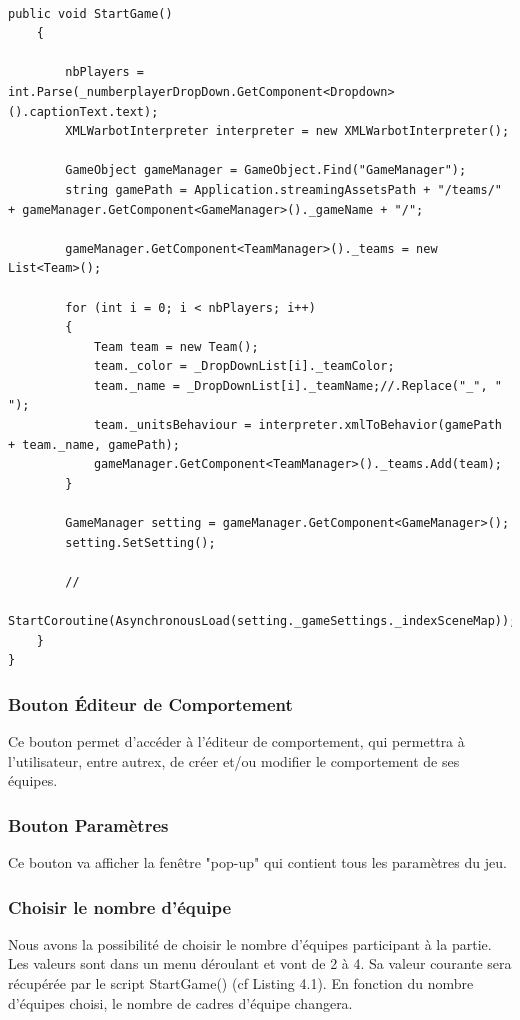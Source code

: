 \documentclass{report}
\begin{document}
\begin{lstlisting}[language={[Sharp]C},label={lst:StartGame()}, caption= Extrait du code de PlayButton.cs]

public void StartGame()
    {
        
        nbPlayers = int.Parse(_numberplayerDropDown.GetComponent<Dropdown>().captionText.text);
        XMLWarbotInterpreter interpreter = new XMLWarbotInterpreter();

        GameObject gameManager = GameObject.Find("GameManager");
        string gamePath = Application.streamingAssetsPath + "/teams/" + gameManager.GetComponent<GameManager>()._gameName + "/";
        
        gameManager.GetComponent<TeamManager>()._teams = new List<Team>();

        for (int i = 0; i < nbPlayers; i++)
        {
            Team team = new Team();
            team._color = _DropDownList[i]._teamColor;
            team._name = _DropDownList[i]._teamName;//.Replace("_", " ");
            team._unitsBehaviour = interpreter.xmlToBehavior(gamePath + team._name, gamePath);
            gameManager.GetComponent<TeamManager>()._teams.Add(team);
        }

        GameManager setting = gameManager.GetComponent<GameManager>();
        setting.SetSetting();

        //
        StartCoroutine(AsynchronousLoad(setting._gameSettings._indexSceneMap));
    }
}
\end{lstlisting}


\subsubsection{Bouton Éditeur de Comportement}
Ce bouton permet d'accéder à l'éditeur de comportement, qui permettra à l'utilisateur, entre autrex, de créer et/ou modifier le comportement de ses équipes.
\subsubsection{Bouton Paramètres}
Ce bouton va afficher la fenêtre "pop-up" qui contient tous les paramètres du jeu.
\subsubsection{Choisir le nombre d'équipe}
Nous avons la possibilité de choisir le nombre d'équipes participant à la partie. Les valeurs sont dans un menu déroulant et vont de 2 à 4. Sa valeur courante sera récupérée par le script StartGame() (cf Listing 4.1).\newline
En fonction du nombre d'équipes choisi, le nombre de cadres d'équipe changera.
\end{document}
